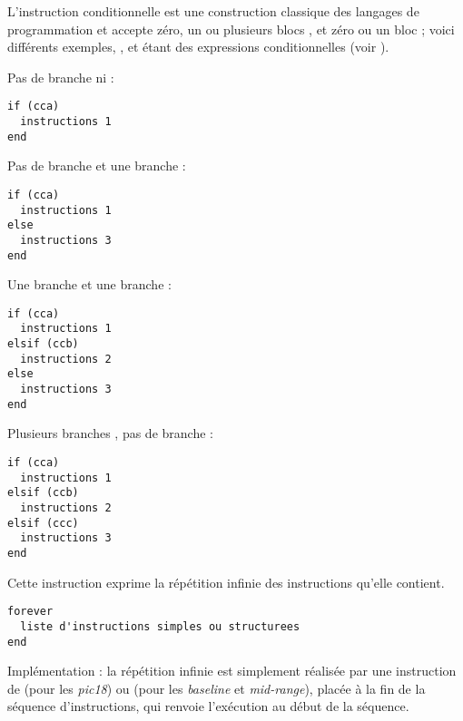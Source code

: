 L'instruction conditionnelle est une construction classique des langages de programmation et accepte zéro, un ou plusieurs blocs , et zéro ou un bloc  ; voici différents exemples, ,  et  étant des expressions conditionnelles (voir ).


Pas de branche  ni  :
\begin{lstlisting}[language=piccolo]
if (cca)
  instructions 1
end
\end{lstlisting}

Pas de branche  et une branche  :
\begin{lstlisting}[language=piccolo]
if (cca)
  instructions 1
else
  instructions 3
end
\end{lstlisting}

Une branche  et une branche  :
\begin{lstlisting}[language=piccolo]
if (cca)
  instructions 1
elsif (ccb)
  instructions 2
else
  instructions 3
end
\end{lstlisting}

Plusieurs branches , pas de branche  :
\begin{lstlisting}[language=piccolo]
if (cca)
  instructions 1
elsif (ccb)
  instructions 2
elsif (ccc)
  instructions 3
end
\end{lstlisting}






Cette instruction exprime la répétition infinie des instructions qu'elle contient.
\begin{lstlisting}[language=piccolo]
forever
  liste d'instructions simples ou structurees
end
\end{lstlisting}

Implémentation : la répétition infinie est simplement réalisée par une instruction de  (pour les \emph{pic18}) ou  (pour les \emph{baseline} et \emph{mid-range}), placée à la fin de la séquence d'instructions, qui renvoie l'exécution au début de la séquence.






